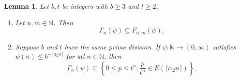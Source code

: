 \documentclass[12pt]{article}
\newtheorem{lemma}{Lemma}[section]
\theoremstyle{definition}
\theoremstyle{remark}
\begin{document}
\begin{lemma}\label{30} 
Let $b,t$ be integers with $b\geq3$ and $t\geq2$.
\begin{enumerate}
\item[(i)] Let $n,m\in\mathbb{N}$.  
Then  
$$\Gamma_{n}(\psi)\subseteq F_{n,m}(\psi).$$
\item[(ii)] Suppose $b$ and $t$ have the same prime divisors.  If $\psi:\mathbb{N}\to(0,\infty)$ satisfies $\psi(n)\leq b^{-\lceil\alpha_{2}n\rceil}$ for all $n\in\mathbb{N}$, then  
\begin{equation}\label{svweakform} \Gamma_{n}(\psi)\subseteq\left\{0\leq p\leq t^{n}:\frac{p}{t^{n}}\in E (\lceil\alpha_{2}n\rceil )\right\}.   \end{equation}
\end{enumerate}
\end{lemma}
\end{document}
